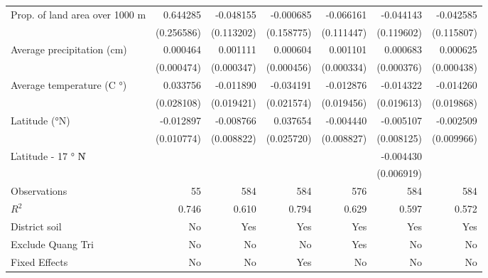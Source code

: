 \begin{table}[htbp]
\begin{tabular}{l*{6}{D{.}{.}{-1}}}
\addlinespace
Prop. of land area over 1000 m&    0.644285\sym{**} &   -0.048155         &   -0.000685         &   -0.066161         &   -0.044143         &   -0.042585         \\
                    &  (0.256586)         &  (0.113202)         &  (0.158775)         &  (0.111447)         &  (0.119602)         &  (0.115807)         \\
\addlinespace
Average precipitation (cm)&    0.000464         &    0.001111\sym{***}&    0.000604         &    0.001101\sym{***}&    0.000683\sym{*}  &    0.000625         \\
                    &  (0.000474)         &  (0.000347)         &  (0.000456)         &  (0.000334)         &  (0.000376)         &  (0.000438)         \\
\addlinespace
Average temperature (C $°$)&    0.033756         &   -0.011890         &   -0.034191         &   -0.012876         &   -0.014322         &   -0.014260         \\
                    &  (0.028108)         &  (0.019421)         &  (0.021574)         &  (0.019456)         &  (0.019613)         &  (0.019868)         \\
\addlinespace
Latitude (°N)       &   -0.012897         &   -0.008766         &    0.037654         &   -0.004440         &   -0.005107         &   -0.002509         \\
                    &  (0.010774)         &  (0.008822)         &  (0.025720)         &  (0.008827)         &  (0.008125)         &  (0.009966)         \\
\addlinespace
\|Latitude - 17 $°$ N\|&                     &                     &                     &                     &   -0.004430         &                     \\
                    &                     &                     &                     &                     &  (0.006919)         &                     \\
\midrule
Observations        &          55         &         584         &         584         &         576         &         584         &         584         \\
\(R^{2}\)           &       0.746         &       0.610         &       0.794         &       0.629         &       0.597         &       0.572         \\
District soil       &          No         &         Yes         &         Yes         &         Yes         &         Yes         &         Yes         \\
Exclude Quang Tri   &          No         &          No         &          No         &         Yes         &          No         &          No         \\
Fixed Effects       &          No         &          No         &         Yes         &          No         &          No         &          No         \\
\bottomrule
\end{tabular}
\end{table}
